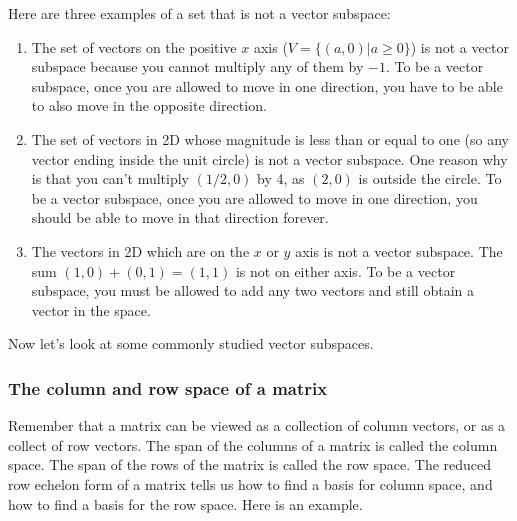 \begin{example}
Here are three examples of a set that is not a vector subspace:
\begin{enumerate}
	\item The set of vectors on the positive $x$ axis ($V=\{(a,0)|a\geq0\}$) is not a vector subspace because you cannot multiply any of them by $-1$. To be a vector subspace, once you are allowed to move in one direction, you have to be able to also move in the opposite direction.
	\item The set of vectors in 2D whose magnitude is less than or equal to one (so any vector ending inside the unit circle) is not a vector subspace.  One reason why is that you can't multiply $(1/2,0)$ by 4, as $(2,0)$ is outside the circle.  To be a vector subspace, once you are allowed to move in one direction, you should be able to move in that direction forever.
	\item The vectors in 2D which are on the $x$ or $y$ axis is not a vector subspace. The sum $(1,0)+(0,1) = (1,1)$ is not on either axis.  To be a vector subspace, you must be allowed to add any two vectors and still obtain a vector in the space.
\end{enumerate}
\end{example}

Now let's look at some commonly studied vector subspaces.

\subsubsection{The column and row space of a matrix}
Remember that a matrix can be viewed as a collection of column vectors, or as a collect of row vectors.  The span of the columns of a matrix is called the column space.  The span of the rows of the matrix is called the row space.  The reduced row echelon form of a matrix tells us how to find a basis for column space, and how to find a basis for the row space.  
Here is an example.

